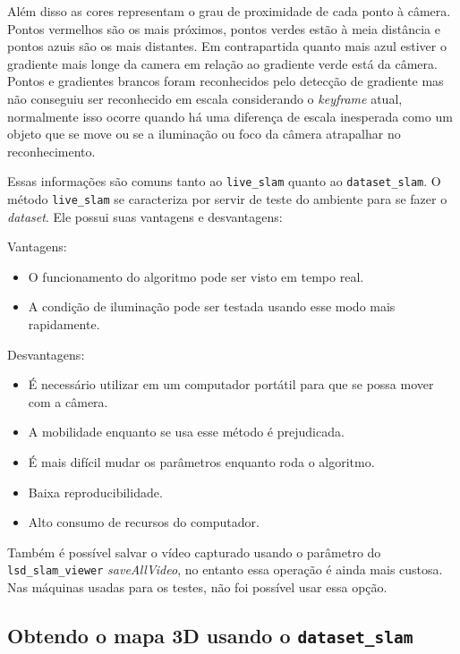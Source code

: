 Além disso as cores representam o grau de proximidade de cada ponto à câmera. Pontos vermelhos são os mais próximos, pontos verdes estão à meia distância e pontos azuis são os mais distantes. Em contrapartida quanto mais azul estiver o gradiente mais longe da camera em relação ao gradiente verde está da câmera. Pontos e gradientes brancos foram reconhecidos pelo detecção de gradiente mas não conseguiu ser reconhecido em escala considerando o \textit{keyframe} atual, normalmente isso ocorre quando há uma diferença de escala inesperada como um objeto que se move ou se a iluminação ou foco da câmera atrapalhar no reconhecimento.

Essas informações são comuns tanto ao \texttt{live\_slam} quanto ao \texttt{dataset\_slam}. O método \texttt{live\_slam} se caracteriza por servir de teste do ambiente para se fazer o \textit{dataset}. Ele possui suas vantagens e desvantagens:

Vantagens:

\begin{itemize}
	\item{O funcionamento do algoritmo pode ser visto em tempo real.}
	\item{A condição de iluminação pode ser testada usando esse modo mais rapidamente.}
\end{itemize}

Desvantagens:

\begin{itemize}
	\item{É necessário utilizar em um computador portátil para que se possa mover com a câmera.}
	\item{A mobilidade enquanto se usa esse método é prejudicada.}
	\item{É mais difícil mudar os parâmetros enquanto roda o algoritmo.}
	\item{Baixa reproducibilidade.}
	\item{Alto consumo de recursos do computador.}
\end{itemize}	

Também é possível salvar o vídeo capturado usando o parâmetro do \texttt{lsd\_slam\_viewer} \textit{saveAllVideo}, no entanto essa operação é ainda mais custosa. Nas máquinas usadas para os testes, não foi possível usar essa opção.

\subsection{Obtendo o mapa 3D usando o \texttt{dataset\_slam}}

